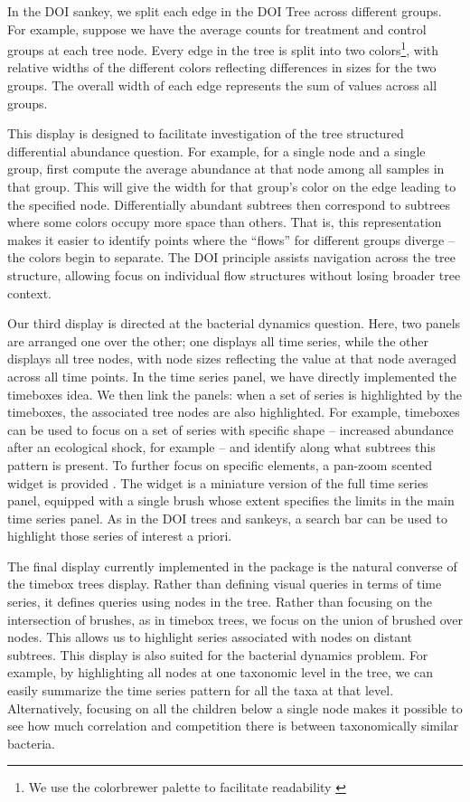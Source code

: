 \documentclass{report}
\begin{document}
In the DOI sankey, we split each edge in the DOI Tree across different groups.
For example, suppose we have the average counts for treatment and control groups
at each tree node. Every edge in the tree is split into two colors\footnote{We
  use the colorbrewer palette to facilitate readability
  \citep{brewer2003colorbrewer}}, with relative widths of the different colors
reflecting differences in sizes for the two groups. The overall width of each
edge represents the sum of values across all groups.

This display is designed to facilitate investigation of the tree structured
differential abundance question. For example, for a single node and a single
group, first compute the average abundance at that node among all samples in
that group. This will give the width for that group's color on the edge leading
to the specified node. Differentially abundant subtrees then correspond to
subtrees where some colors occupy more space than others. That is, this
representation makes it easier to identify points where the ``flows'' for
different groups diverge -- the colors begin to separate. The DOI principle
assists navigation across the tree structure, allowing focus on individual flow
structures without losing broader tree context.

Our third display is directed at the bacterial dynamics question. Here, two
panels are arranged one over the other; one displays all time series, while the
other displays all tree nodes, with node sizes reflecting the value at that node
averaged across all time points. In the time series panel, we have directly
implemented the timeboxes idea. We then link the panels: when a set of series is
highlighted by the timeboxes, the associated tree nodes are also highlighted.
For example, timeboxes can be used to focus on a set of series with specific
shape -- increased abundance after an ecological shock, for example -- and
identify along what subtrees this pattern is present. To further focus on
specific elements, a pan-zoom scented widget is provided
\citep{willett2007scented}. The widget is a miniature version of the full time
series panel, equipped with a single brush whose extent specifies the limits in
the main time series panel. As in the DOI trees and sankeys, a search bar can be
used to highlight those series of interest a priori.

The final display currently implemented in the package is the natural converse
of the timebox trees display. Rather than defining visual queries in terms of
time series, it defines queries using nodes in the tree. Rather than focusing on
the intersection of brushes, as in timebox trees, we focus on the union of
brushed over nodes. This allows us to highlight series associated with nodes on
distant subtrees. This display is also suited for the bacterial dynamics
problem. For example, by highlighting all nodes at one taxonomic level in the
tree, we can easily summarize the time series pattern for all the taxa at that
level. Alternatively, focusing on all the children below a single node makes it
possible to see how much correlation and competition there is between
taxonomically similar bacteria.
\end{document}
